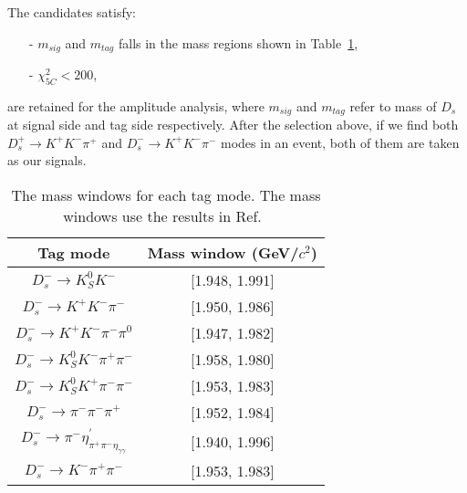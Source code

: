 {The candidates satisfy:
\begin{itemize}
    \item[-] $m_{sig}$ and $m_{tag}$ falls in the mass regions shown in Table~\ref{ST-mass-window}, 
	\item[-] $\chi_{5C}^{2} < 200 $, 
\end{itemize}
are retained for the amplitude analysis, where $m_{sig}$ and $m_{tag}$ refer to mass of $D_{s}$ at signal side and tag side respectively.
After the selection above, if we find both $D_{s}^{+} \rightarrow K^{+}K^{-}\pi^{+}$ and $D_{s}^{-} \rightarrow K^{+}K^{-}\pi^{-}$ modes in an event, both of them are taken as our signals.
\begin{table}[htbp]
    \caption{ The mass windows for each tag mode. The mass windows use the results in Ref.~\cite{Doc-DB-630-v35} }
    \label{ST-mass-window}
    \begin{center}
        \begin{tabular}{cc}
            \toprule\toprule
            Tag mode & Mass window (GeV/$c^{2}$)  \\
            \hline
            $D_{s}^{-} \rightarrow K_{S}^{0}K^{-}$                          & [1.948, 1.991]    \\
            $D_{s}^{-} \rightarrow K^{+}K^{-}\pi^{-}$                       & [1.950, 1.986]    \\
            $D_{s}^{-} \rightarrow K^{+}K^{-}\pi^{-}\pi^{0}$                & [1.947, 1.982]    \\
            $D_{s}^{-} \rightarrow K_{S}^{0}K^{-}\pi^{+}\pi^{-}$            & [1.958, 1.980]    \\
            $D_{s}^{-} \rightarrow K_{S}^{0}K^{+}\pi^{-}\pi^{-}$            & [1.953, 1.983]    \\
            $D_{s}^{-} \rightarrow \pi^{-}\pi^{-}\pi^{+}$                   & [1.952, 1.984]    \\
            $D_{s}^{-} \rightarrow \pi^{-}\eta_{\pi^{+}\pi^{-}\eta_{\gamma\gamma}}^{'}$  & [1.940, 1.996]        \\
            $D_{s}^{-} \rightarrow K^{-}\pi^{+}\pi^{-}$                     & [1.953, 1.983]    \\
            \bottomrule\bottomrule
        \end{tabular}
    \end{center}
\end{table}

}

